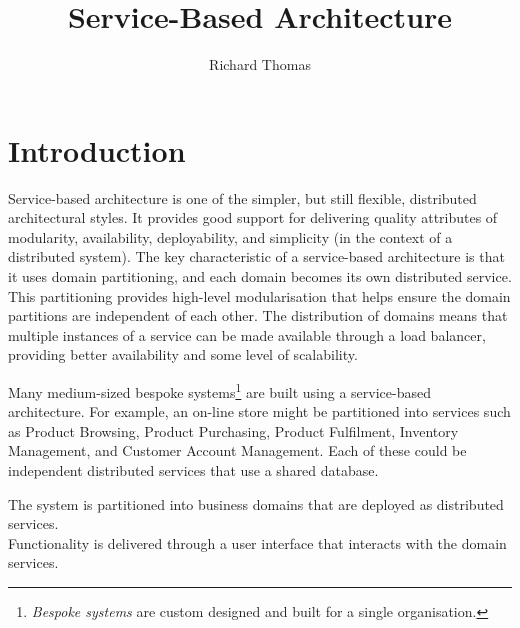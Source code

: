 \title{Service-Based Architecture}
\author{Richard Thomas}
\date{}

\maketitle

\section{Introduction}

Service-based architecture is one of the simpler, but still flexible, distributed architectural styles.
It provides good support for delivering quality attributes of modularity, availability, deployability, and simplicity (in the context of a distributed system).
The key characteristic of a service-based architecture is that it uses domain partitioning, and each domain becomes its own distributed service.
This partitioning provides high-level modularisation that helps ensure the domain partitions are independent of each other.
The distribution of domains means that multiple instances of a service can be made available through a load balancer,
providing better availability and some level of scalability.

Many medium-sized bespoke systems\footnote{\emph{Bespoke systems} are custom designed and built for a single organisation.}
are built using a service-based architecture.
For example, an on-line store might be partitioned into services such as Product Browsing,
Product Purchasing, Product Fulfilment, Inventory Management, and Customer Account Management.
Each of these could be independent distributed services that use a shared database.

\vspace{2mm}
\begin{definition}
    The system is partitioned into business domains that are deployed as distributed services.\\
    Functionality is delivered through a user interface that interacts with the domain services.
\end{definition}

